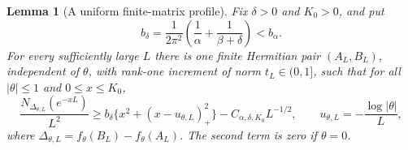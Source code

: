 \documentclass[11pt]{article}
\newtheorem{lemma}[theorem]{Lemma}
\numberwithin{equation}{section}
\begin{document}
\begin{lemma}[A uniform finite-matrix profile]\label{lem:uniformprofile}
Fix $\delta>0$ and $K_0>0$, and put
\[
 b_\delta=\frac1{2\pi^2}
       \left(\frac1\alpha+\frac1{\beta+\delta}\right)<b_\alpha.
\]
For every sufficiently large $L$ there is one finite Hermitian pair
$(A_L,B_L)$, independent of $\theta$, with rank-one increment of norm
$t_L\in(0,1]$, such that for all $|\theta|\le1$ and $0\le x\le K_0$,
\begin{equation}\label{eq:uniformprofile}
 \frac{N_{\Delta_{\theta,L}}(e^{-xL})}{L^2}
 \ge b_\delta\{x^2+(x-u_{\theta,L})_+^2\}
              -C_{\alpha,\delta,K_0}L^{-1/2},\qquad
 u_{\theta,L}=-\frac{\log|\theta|}{L},
\end{equation}
where $\Delta_{\theta,L}=f_\theta(B_L)-f_\theta(A_L)$.
The second term is zero if $\theta=0$.
\end{lemma}
\end{document}
